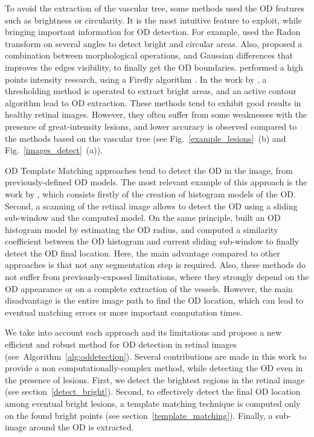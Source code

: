 To avoid the extraction of the vascular tree, some methods used the OD features such as brightness or circularity. It is the most intuitive feature to exploit, while bringing important information for OD detection. For example, \citet{pourreza} used the Radon transform \citep{radon} on several angles to detect bright and circular areas. Also, \citet{hashim} proposed a combination between morphological operations, and Gaussian differences that improves the edges visibility, to finally get the OD boundaries. \citet{rahebi} performed a high points intensity research, using a Firefly algorithm \citep{firefly}. In the work by \citet{giraddi}, a thresholding method is operated to extract bright areas, and an active contour algorithm lead to OD extraction. These methods tend to exhibit good results in healthy retinal images. However, they often suffer from some weaknesses with the presence of great-intensity lesions, and lower accuracy is observed compared to the methods based on the vascular tree (see \mbox{Fig. \ref{example_lesions} (b)} and \mbox{Fig. \ref{images_detect} (a)}).

OD Template Matching approaches tend to detect the OD in the image, from previously-defined OD models. The most relevant example of this approach is the work by \citet{dehghani}, which consists firstly of the creation of histogram models of the OD. Second, a scanning of the retinal image allows to detect the OD using a sliding sub-window and the computed model. On the same principle, \citet{wankhede} built an OD histogram model by estimating the OD radius, and computed a similarity coefficient between the OD histogram and current sliding sub-window to finally detect the OD final location.
Here, the main advantage compared to other approaches is that not any segmentation step is required. Also, these methods do not suffer from previously-exposed limitations, where they strongly depend on the OD appearance or on a complete extraction of the vessels. However, the main disadvantage is the entire image path to find the OD location, which can lead to eventual matching errors or more important computation times. 



We take into account each approach and its limitations and propose a new efficient and robust method for OD detection in retinal images \mbox{(see Algorithm~\ref{alg:oddetection})}. Several contributions are made in this work to provide a non computationally-complex method, while detecting the OD even in the presence of lesions. First, we detect the brightest regions in the retinal image (see \mbox{section \ref{detect_bright}}). Second, to effectively detect the final OD location among eventual bright lesions, a template matching technique is computed only on the found bright points (see \mbox{section \ref{template_matching}}). Finally, a sub-image around the OD is extracted.

